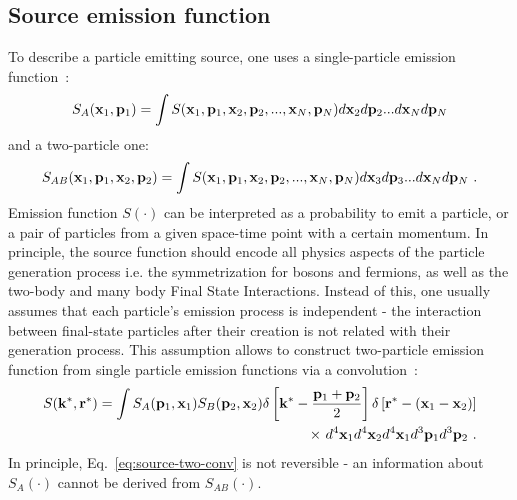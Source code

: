     \subsection{Source emission function}
    \label{sec:source-emission-function}
      To describe a particle emitting source, one uses a single-particle emission function~\cite{nonidfemto}:
      \begin{equation}
        \label{eq:source-single-3d}
        S_A(\mathbf{x}_1,\mathbf{p}_1) = \int S(\mathbf{x}_1,\mathbf{p}_1,\mathbf{x}_2,\mathbf{p}_2,...,\mathbf{x}_N,\mathbf{p}_N)
        d \mathbf{x}_2 d \mathbf{p}_2 ... d \mathbf{x}_N d \mathbf{p}_N
      \end{equation}
      and a two-particle one:
      \begin{equation}
        \label{eq:source-two-3d}
        S_{AB}(\mathbf{x}_1,\mathbf{p}_1,\mathbf{x}_2,\mathbf{p}_2) = \int S(\mathbf{x}_1,\mathbf{p}_1,\mathbf{x}_2,\mathbf{p}_2,...,\mathbf{x}_N,\mathbf{p}_N)
        d \mathbf{x}_3 d \mathbf{p}_3 ... d \mathbf{x}_N d \mathbf{p}_N~.
      \end{equation}
      Emission function $S(\cdot)$ can be interpreted as a probability to emit a particle, or a pair of particles from a given space-time point with a certain momentum.
      In principle, the source function should encode all physics aspects of the particle generation process i.e. the symmetrization for bosons and fermions, as well as the two-body and many body Final State Interactions.
      Instead of this, one usually assumes that each particle's emission process is independent - the interaction between final-state particles after their creation is not related with their generation process.
      This assumption allows to construct two-particle emission function from single particle emission functions via a convolution~\cite{nonidfemto}:
      \begin{equation}
        \label{eq:source-two-conv}
        \begin{split}
          S(\mathbf{k}^{*},\mathbf{r}^{*}) = \int S_A ( \mathbf{p}_1, \mathbf{x}_1 ) S_B ( \mathbf{p}_2, \mathbf{x}_2 )
          \delta \left[\mathbf{k}^{*} - \frac{\mathbf{p}_1+\mathbf{p}_2}{2} \right]
          \delta \left[\mathbf{r}^{*} - (\mathbf{x}_1-\mathbf{x}_2) \right] \\
          \times~d^4 \mathbf{x}_1 d^4 \mathbf{x}_2 d^4 \mathbf{x}_1 d^3 \mathbf{p}_1 d^3 \mathbf{p}_2~.
        \end{split}
      \end{equation}
      In principle, Eq.~\ref{eq:source-two-conv} is not reversible - an information about $S_A(\cdot)$ cannot be derived from $S_{AB}(\cdot)$.
